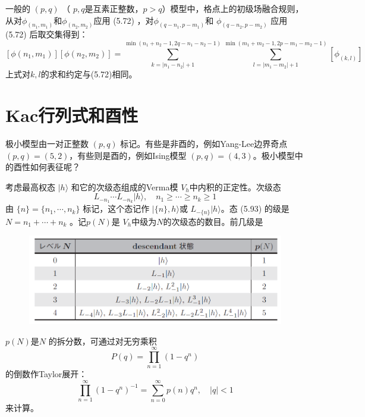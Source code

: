 一般的 $(p,q)$ （ $p,q $是互素正整数，$ p>q $）模型中，格点上的初级场融合规则，从对$ \phi_{\left(n_{1}, m_{1}\right)} $和$ \phi_{\left(n_{2}, m_{2}\right)} $应用 (5.72) ，对$ \phi_{\left(q-n_{1}, p-m_{1}\right)} $和 $\phi_{\left(q-n_{2}, p-m_{2}\right)}$ 应用 (5.72) 后取交集得到：
\begin{equation}
	\left[\phi\left(n_{1}, m_{1}\right)\right]\left[\phi\left(n_{2}, m_{2}\right)\right]=\sum_{k=\left|n_{1}-n_{2}\right|+1}^{\min \left(n_{1}+n_{2}-1,2 q-n_{1}-n_{2}-1\right)}\sum_{l=\left|m_{1}-m_{2}\right|+1}^{\min \left(m_{1}+m_{2}-1,2 p-m_{1}-m_{2}-1\right)}\left[\phi_{(k, l)}\right]
\end{equation}
上式对$k,l$的求和约定与(5.72)相同。

\section{Kac行列式和酉性}
极小模型由一对正整数 $(p,q)$ 标记。有些是非酉的，例如Yang-Lee边界奇点 $(p,q)=(5,2)$，有些则是酉的，例如Ising模型 $(p,q)=(4,3) $。极小模型中的酉性如何表征呢？

考虑最高权态 $|h\rangle$ 和它的次级态组成的Verma模 $V_h $中内积的正定性。次级态
\begin{equation}
	L_{-n_1}\cdots L_{-n_k}|h\rangle,\quad n_1\geq\cdots \geq n_k\geq 1
\end{equation}
由 $\{n\}=\{n_1,\cdots ,n_k\}$ 标记，这个态记作 $|\{n\},h\rangle $或 $L_{-\{n\}}|h\rangle $。态 (5.93) 的级是$ N=n_1+\cdots+n_k$ 。记$ p(N) $是 $V_h $中级为$ N $的次级态的数目。前几级是
\begin{figure}[h]
	\centering
	\includegraphics[width=0.6\linewidth]{fig/5.2notag.png}
\end{figure}

$p(N) $是$ N$ 的拆分数，可通过对无穷乘积
\begin{equation}
	P(q)=\prod_{n=1}^{\infty}\left(1-q^{n}\right)
\end{equation}
的倒数作Taylor展开：
\begin{equation}
	\prod_{n=1}^{\infty}\left(1-q^{n}\right)^{-1}=\sum_{n=0}^{\infty} p(n) q^{n}, \quad|q|<1
\end{equation}
来计算。

